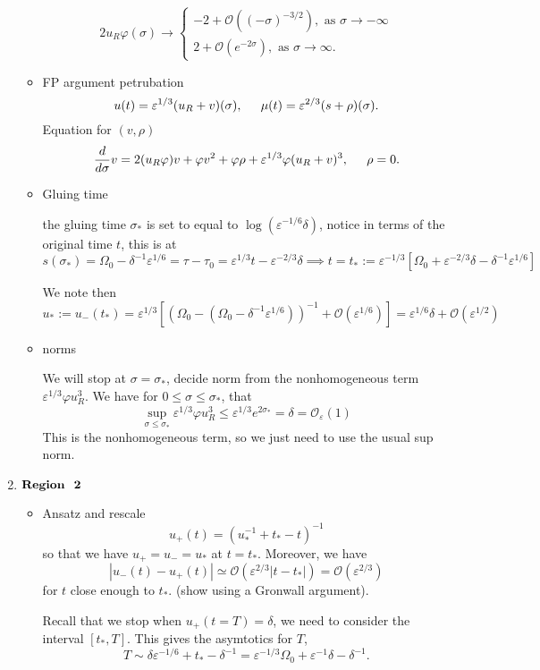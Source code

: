 \documentclass[letterpaper,11pt]{article}
\newcommand{\rmO}{\mathcal{O}}
\newcommand{\eps}{\varepsilon}
\numberwithin{equation}{section}
\theoremstyle{plain}
\begin{document}
\begin{enumerate}
\begin{itemize}
\begin{equation*}
2u_R\varphi(\sigma) \to\begin{cases}
-2+ \rmO((-\sigma)^{-3/2}), \text{ as }\sigma \to -\infty\\
2+ \rmO(e^{-2\sigma}), \text{ as }\sigma \to \infty.
\end{cases}
\end{equation*}
\item FP argument
petrubation 
\[
u(t) = \eps^{1/3}(u_R+v)(\sigma), \hspace{0.2in} \mu(t) = \eps^{2/3}(s+\rho)(\sigma).
\]
Equation for $(v,\rho)$
\[
\frac{d}{d\sigma} v = 2(u_R\varphi) v+\varphi v^2 +\varphi\rho+\eps^{1/3}\varphi(u_R+v)^3, \hspace{ 0.2in } \rho = 0.
\]
\item Gluing time


the gluing time $\sigma_*$ is set to equal to $ \log(\eps^{-1/6}\delta )$, notice in terms of the original time $t$, this is at
\[
s(\sigma_*) = \Omega_0-\delta^{-1}\eps^{1/6} = \tau -\tau_0 = \eps^{1/3}t - \eps^{-2/3}\delta \implies   t=t_*:= \eps^{-1/3}[\Omega_0+\eps^{-2/3}\delta -\delta^{-1} \eps^{1/6}]
\]

We note then 
\[
u_*:= u_-(t_*) = \eps^{1/3}[(\Omega_0-(\Omega_0-\delta^{-1}\eps^{1/6}))^{-1} + \rmO(\eps^{1/6})]  = \eps^{1/6}\delta+\rmO(\eps^{1/2})
\]
\item norms

We will stop at  $\sigma=\sigma_*$, decide norm from the nonhomogeneous term $\eps^{1/3}\varphi u_R^3 $. We have for $0 \le \sigma \le \sigma_*$, that
\[
\sup_{\sigma \le \sigma_*} \eps^{1/3}\varphi u_R^3 \le \eps^{1/3}e^{2\sigma_*} = \delta = \rmO_\eps(1)
\]
This is the nonhomogeneous term, so we just need to use the usual sup norm.
\end{itemize} 


\item $\bold{Region \hspace{0.1in} 2}$ 
\begin{itemize}
\item Ansatz and rescale
\[
u_+(t) = (u_*^{-1} +t_*-t)^{-1}
\]
so that we have $u_+ = u_- = u_*$ at $t=t_*$. Moreover, we have
\[
|u_-(t)-u_+(t)| \simeq \rmO(\eps^{2/3}|t-t_*|)=\rmO(\eps^{2/3})
\]
for $t$ close enough to $t_*$. (show using a Gronwall argument).

Recall that we stop when $u_+(t=T)=\delta$, we need to consider the interval $[t_*, T]$. This gives the asymtotics for $T$,
\[
T \sim \delta\eps^{-1/6} + t_* -\delta^{-1} = \eps^{-1/3}\Omega_0 +\eps^{-1}\delta -\delta^{-1}.
\]


\end{itemize}
\end{enumerate}
\end{document}
